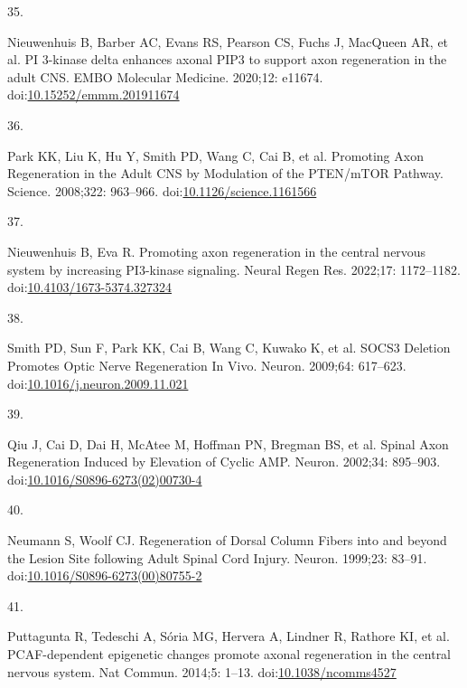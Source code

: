 \documentclass[
  12pt,
  a4paper,
]{book}
\newlength{\cslhangindent}
\newlength{\csllabelwidth}
\newlength{\cslentryspacingunit} %
\newenvironment{CSLReferences}[2] %
 {%
  \setlength{\parindent}{0pt}
  \ifodd #1
  \let\oldpar\par
  \def\par{\hangindent=\cslhangindent\oldpar}
  \fi
  \setlength{\parskip}{#2\cslentryspacingunit}
 }%
 {}
\newcommand{\CSLLeftMargin}[1]{\parbox[t]{\csllabelwidth}{#1}}
\newcommand{\CSLRightInline}[1]{\parbox[t]{\linewidth - \csllabelwidth}{#1}\break}
\begin{document}
\begin{CSLReferences}{0}{0}
\leavevmode{}%
\CSLLeftMargin{35. }%
\CSLRightInline{Nieuwenhuis B, Barber AC, Evans RS, Pearson CS, Fuchs J, MacQueen AR, et al. {PI} 3-kinase delta enhances axonal {PIP3} to support axon regeneration in the adult {CNS}. EMBO Molecular Medicine. 2020;12: e11674. doi:\href{https://doi.org/10.15252/emmm.201911674}{10.15252/emmm.201911674}}

\leavevmode{}%
\CSLLeftMargin{36. }%
\CSLRightInline{Park KK, Liu K, Hu Y, Smith PD, Wang C, Cai B, et al. Promoting {Axon Regeneration} in the {Adult CNS} by {Modulation} of the {PTEN}/{mTOR Pathway}. Science. 2008;322: 963--966. doi:\href{https://doi.org/10.1126/science.1161566}{10.1126/science.1161566}}

\leavevmode{}%
\CSLLeftMargin{37. }%
\CSLRightInline{Nieuwenhuis B, Eva R. Promoting axon regeneration in the central nervous system by increasing {PI3-kinase} signaling. Neural Regen Res. 2022;17: 1172--1182. doi:\href{https://doi.org/10.4103/1673-5374.327324}{10.4103/1673-5374.327324}}

\leavevmode{}%
\CSLLeftMargin{38. }%
\CSLRightInline{Smith PD, Sun F, Park KK, Cai B, Wang C, Kuwako K, et al. {SOCS3 Deletion Promotes Optic Nerve Regeneration In Vivo}. Neuron. 2009;64: 617--623. doi:\href{https://doi.org/10.1016/j.neuron.2009.11.021}{10.1016/j.neuron.2009.11.021}}

\leavevmode{}%
\CSLLeftMargin{39. }%
\CSLRightInline{Qiu J, Cai D, Dai H, McAtee M, Hoffman PN, Bregman BS, et al. Spinal {Axon Regeneration Induced} by {Elevation} of {Cyclic AMP}. Neuron. 2002;34: 895--903. doi:\href{https://doi.org/10.1016/S0896-6273(02)00730-4}{10.1016/S0896-6273(02)00730-4}}

\leavevmode{}%
\CSLLeftMargin{40. }%
\CSLRightInline{Neumann S, Woolf CJ. Regeneration of {Dorsal Column Fibers} into and beyond the {Lesion Site} following {Adult Spinal Cord Injury}. Neuron. 1999;23: 83--91. doi:\href{https://doi.org/10.1016/S0896-6273(00)80755-2}{10.1016/S0896-6273(00)80755-2}}

\leavevmode{}%
\CSLLeftMargin{41. }%
\CSLRightInline{Puttagunta R, Tedeschi A, Sória MG, Hervera A, Lindner R, Rathore KI, et al. {PCAF-dependent} epigenetic changes promote axonal regeneration in the central nervous system. Nat Commun. 2014;5: 1--13. doi:\href{https://doi.org/10.1038/ncomms4527}{10.1038/ncomms4527}}


\end{CSLReferences}
\end{document}
